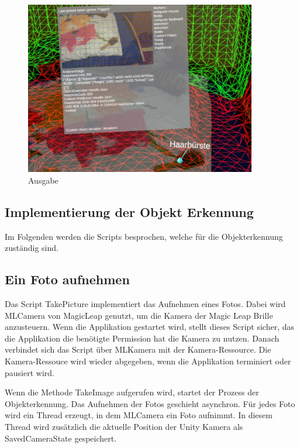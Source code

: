 \begin{figure}[H]
	\centering
	\includegraphics[width=0.9\textwidth]{images/ML_20201004_19.09.17_2.jpg}
	\caption[UI Ausgabe in der Szene]{Ausgabe}
	\label{img:ausgabe}
\end{figure}


\subsection{Implementierung der Objekt Erkennung}

Im Folgenden werden die Scripts besprochen, welche für die Objekterkennung zuständig sind.

\subsection{Ein Foto aufnehmen}


Das Script TakePicture implementiert das Aufnehmen eines Fotos. Dabei wird MLCamera von MagicLeap genutzt, um die Kamera der Magic Leap Brille anzusteuern. Wenn die Applikation gestartet wird, stellt dieses Script sicher, das die Applikation die benötigte Permission hat die Kamera zu nutzen. Danach verbindet sich das Script über MLKamera mit der Kamera-Ressource. 
Die Kamera-Ressouce wird wieder abgegeben, wenn die Applikation terminiert oder pausiert wird.

Wenn die Methode TakeImage aufgerufen wird, startet der Prozess der Objekterkennung.
Das Aufnehmen der Fotos geschieht asynchron. Für jedes Foto wird ein Thread erzeugt, in dem MLCamera ein Foto aufnimmt. In diesem Thread wird zusätzlich die aktuelle Position der Unity Kamera als SavedCameraState gespeichert.

